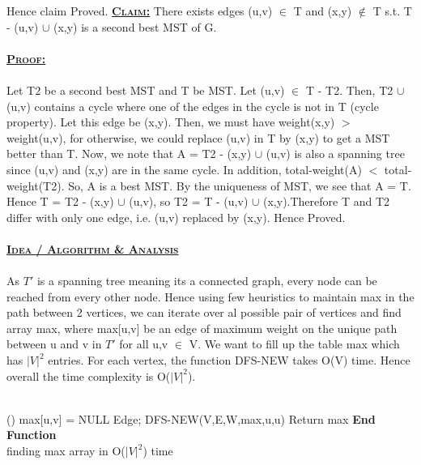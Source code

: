 \documentclass[a4 paper]{article}
\begin{document}
Hence claim Proved.
\newpage
{}
\textbf{\underline{\textsc{Claim:}}}
There exists edges (u,v) $\in$ T and (x,y) $\notin$ T s.t. T - (u,v) $\cup$ (x,y) is a second best MST of G.\\\\
\textbf{\underline{\textsc{Proof:}}} \\\\Let T2 be a second best MST and T be MST. Let (u,v) $\in$ T - T2. Then, T2 $\cup$ (u,v) contains a cycle where one of the edges in the cycle is not in T (cycle property). Let this edge be (x,y). Then, we must have weight(x,y) $>$ weight(u,v), for otherwise, we could replace (u,v) in T by (x,y) to get a MST better than T. Now, we note that A = T2 - (x,y) $\cup$ (u,v) is also a spanning tree since (u,v) and (x,y) are in the same cycle. In addition, total-weight(A) $<$ total-weight(T2). So, A is a best MST. By the uniqueness of MST, we see that A = T.\\
Hence T = T2 - (x,y) $\cup$ (u,v), so T2 = T - (u,v) $\cup$ (x,y).Therefore T and T2 differ with only one edge, i.e. (u,v) replaced by (x,y). Hence Proved.\\\\
\textbf{\underline{\textsc{Idea / Algorithm \& Analysis}}}\\\\
As $T{'}$ is a spanning tree meaning its a connected graph, every node can be reached from every other node. Hence using few heuristics to maintain max in the path between 2 vertices, we can iterate over al possible pair of vertices and find array max, where max[u,v] be an edge of maximum weight on the unique path between u and v in $T{'}$ for all u,v $\in$ V. We want to fill up the table max which has $|V|^{2}$ entries. For each vertex, the function DFS-NEW takes O(V) time. Hence overall the time complexity is O($|V|^{2}$).\\\\
\begin{algorithm}[H]
\SetAlgoLined
{}
%
\Fn(){\FRecurs}
{
    {
        {
            max[u,v] = NULL Edge;
        }
        DFS-NEW(V,E,W,max,u,u)\;
    }
Return max\;
}
\textbf{End Function}\\
\caption{finding max array in O($|V|^{2}$) time}
\end{algorithm}
\end{document}
